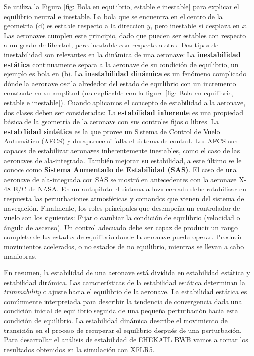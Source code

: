 Se utiliza la Figura \ref{fig: Bola en equilibrio, estable e inestable} para explicar el equilibrio neutral e inestable. 
%
La bola que se encuentra en el centro de la geometría (d) es estable respecto a la dirección $y$, pero inestable si desplaza en $x$. 
Las aeronaves cumplen este principio, dado que pueden ser estables con respecto a un grado de libertad, pero inestable con respecto a otro. 
%
Dos tipos de inestabilidad son relevantes en la dinámica de una aeronave:
La \textbf{inestabilidad estática} continuamente separa a la aeronave de su condición de equilibrio, un ejemplo es bola en (b).
La \textbf{inestabilidad dinámica} es un fenómeno complicado dónde la aeronave oscila alrededor del estado de equilibrio con un incremento constante en su amplitud (no explicable con la figura \ref{fig: Bola en equilibrio, estable e inestable}).
%
Cuando aplicamos el concepto de estabilidad a la aeronave, dos clases deben ser consideradas: 
La \textbf{estabilidad inherente} es una propiedad básica de la geometría de la aeronave con sus controles fijos o libres.
La \textbf{estabilidad sintética} es la que provee un Sistema de Control de Vuelo Automático (AFCS) y desaparece si falla el sistema de control. 
%
Los AFCS son capaces de estabilizar aeronaves inherentemente inestables, como el caso de las aeronaves de ala-integrada. También mejoran su estabilidad, a este último se le conoce como \textbf{Sistema Aumentado de Estabilidad (SAS)}. El caso de una aeronave de ala-integrada con SAS se mostró en antecedentes con la aeronave X-48 B/C de NASA. 
%
En un autopiloto el sistema a lazo cerrado debe estabilizar en respuesta las perturbaciones atmosféricas y comandos que vienen del sistema de navegación. 
%
Finalmente, los roles principales que desempeña un controlador de vuelo son los siguientes:
Fijar o cambiar la condición de equilibrio (velocidad o ángulo de ascenso). Un control adecuado debe ser capaz de producir un rango completo de los estados de equilibrio donde la aeronave pueda operar.
Producir movimientos acelerados, o no estados de no equilibrio, mientras se llevan a cabo maniobras.

En resumen, la estabilidad de una aeronave está dividida en estabilidad estática y estabilidad dinámica. 
%
Las características de la estabilidad estática determinan la \textit{trimmability} o ajuste hacia el equilibrio de la aeronave. 
La estabilidad estática es comúnmente interpretada para describir la tendencia de convergencia dada una condición inicial de equilibrio seguida de una pequeña perturbación hacia esta condición de equilibrio.
%
La estabilidad dinámica describe el movimiento de transición en el proceso de recuperar el equilibrio después de una perturbación. 
%
Para desarrollar el análisis de estabilidad de EHEKATL BWB vamos a tomar los resultados obtenidos en la simulación con XFLR5. 

